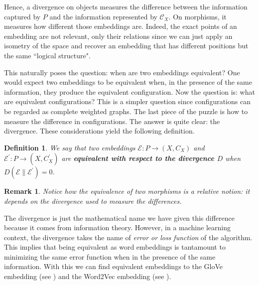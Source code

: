 \documentclass[10pt,a4paper]{elsarticle}
\newcommand{\C}{\mathcal{C}}
\newtheorem{definition}[theorem]{Definition}
\newtheorem{re}[theorem]{Remark}
\begin{document}
Hence, a divergence on objects measures the difference between the information captured by $P$ and the information represented by $\C_{X}$. On morphisms, it measures how different those embeddings are. Indeed, the exact points of an embedding are not relevant, only their relations since we can just apply an isometry of the space and recover an embedding that has different positions but the same ``logical structure". 

This naturally poses the question: when are two embeddings equivalent? One would expect two embeddings to be equivalent when, in the presence of the same information, they produce the equivalent configuration. Now the question is: what are equivalent configurations? This is a simpler question since configurations can be regarded as complete weighted graphs. The last piece of the puzzle is how to measure the difference in configurations. The answer is quite clear: the divergence. These considerations yield the following definition.

\begin{definition}
	We say that two embeddings $\mathcal{E}\colon P\to (X,C_{X})$ and $\mathcal{E}^{\prime}\colon P\to(X,C^{\prime}_{X})$ are \textbf{equivalent with respect to the divergence $D$} when $D(\mathcal{E}\| \mathcal{E}^{\prime})=0$.
\end{definition}

\begin{re}
Notice how the equivalence of two morphisms is a relative notion: it depends on the divergence used to measure the differences. 

\end{re}

The divergence is just the mathematical name we have given this difference because it comes from information theory. However, in a machine learning context, the divergence takes the name of \textit{error or loss function} of the algorithm. This implies that being equivalent as word embeddings is tantamount to minimizing the same error function when in the presence of the same information. With this we can find equivalent embeddings to the GloVe embedding (see \cite{pennington2014glove}) and the Word2Vec embedding (see \cite{Mikolov2013EfficientEO}).
\end{document}
